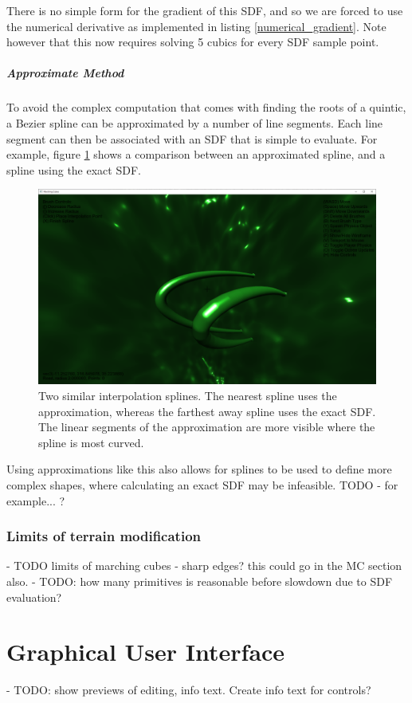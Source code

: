 \documentclass{article}
\begin{document}
There is no simple form for the gradient of this SDF, and so we are forced to use the numerical derivative as implemented in listing \ref{numerical_gradient}. Note however that this now requires solving 5 cubics for every SDF sample point.

\subparagraph{Approximate Method}
To avoid the complex computation that comes with finding the roots of a quintic, a Bezier spline can be approximated by a number of line segments. Each line segment can then be associated with an SDF that is simple to evaluate. For example, figure \ref{fig:spline_approximation} shows a comparison between an approximated spline, and a spline using the exact SDF.
\begin{figure}[H]
  \includegraphics[width=\textwidth]{spline_approximation_2.png}
  \caption{Two similar interpolation splines. The nearest spline uses the approximation, whereas the farthest away spline uses the exact SDF. The linear segments of the approximation are more visible where the spline is most curved.}
  \label{fig:spline_approximation}
\end{figure}

Using approximations like this also allows for splines to be used to define more complex shapes, where calculating an exact SDF may be infeasible.
TODO - for example... ?

\subsubsection{Limits of terrain modification}
 - TODO limits of marching cubes - sharp edges? this could go in the MC section also. 
 - TODO: how many primitives is reasonable before slowdown due to SDF evaluation?\\
\section{Graphical User Interface}
 - TODO: show previews of editing, info text. Create info text for controls?
 
\end{document}
